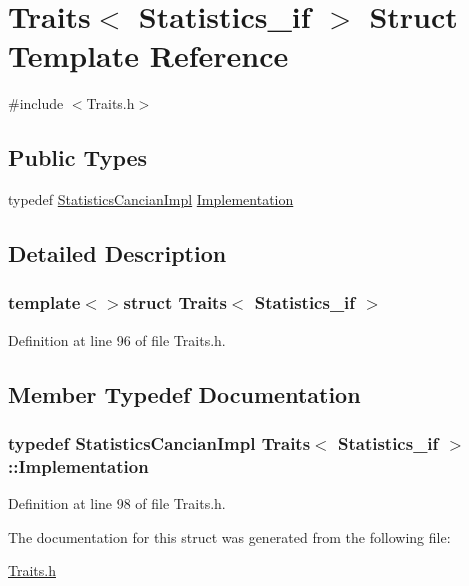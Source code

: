 \hypertarget{struct_traits_3_01_statistics__if_01_4}{\section{Traits$<$ Statistics\-\_\-if $>$ Struct Template Reference}
\label{struct_traits_3_01_statistics__if_01_4}
}


{\ttfamily \#include $<$Traits.\-h$>$}

\subsection*{Public Types}
\begin{DoxyCompactItemize}
\item 
typedef \hyperlink{class_statistics_cancian_impl}{Statistics\-Cancian\-Impl} \hyperlink{struct_traits_3_01_statistics__if_01_4_a96b3a1f9dc72c141d92f389c86907228}{Implementation}
\end{DoxyCompactItemize}


\subsection{Detailed Description}
\subsubsection*{template$<$$>$struct Traits$<$ Statistics\-\_\-if $>$}



Definition at line 96 of file Traits.\-h.



\subsection{Member Typedef Documentation}
\hypertarget{struct_traits_3_01_statistics__if_01_4_a96b3a1f9dc72c141d92f389c86907228}{
\subsubsection[{Implementation}]{\setlength{\rightskip}{0pt plus 5cm}typedef {\bf Statistics\-Cancian\-Impl} {\bf Traits}$<$ {\bf Statistics\-\_\-if} $>$\-::{\bf Implementation}}}\label{struct_traits_3_01_statistics__if_01_4_a96b3a1f9dc72c141d92f389c86907228}


Definition at line 98 of file Traits.\-h.



The documentation for this struct was generated from the following file\-:\begin{DoxyCompactItemize}
\item 
\hyperlink{_traits_8h}{Traits.\-h}\end{DoxyCompactItemize}
